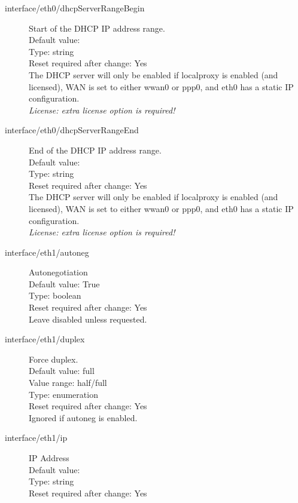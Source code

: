\begin{description}
\item[interface/eth0/dhcpServerRangeBegin] Start of the DHCP IP address range.\\
  Default value: \\
  Type: string\\
  Reset required after change: Yes\\
  The DHCP server will only be enabled if localproxy is enabled (and licensed), WAN is set to either wwan0 or ppp0, and eth0 has a static IP configuration.\\
  \emph{License: extra license option is required!}\\

\item[interface/eth0/dhcpServerRangeEnd] End of the DHCP IP address range.\\
  Default value: \\
  Type: string\\
  Reset required after change: Yes\\
  The DHCP server will only be enabled if localproxy is enabled (and licensed), WAN is set to either wwan0 or ppp0, and eth0 has a static IP configuration.\\
  \emph{License: extra license option is required!}\\

\item[interface/eth1/autoneg] Autonegotiation\\
  Default value: True\\
  Type: boolean\\
  Reset required after change: Yes\\
  Leave disabled unless requested.\\

\item[interface/eth1/duplex] Force duplex.\\
  Default value: full\\
  Value range: half/full\\
  Type: enumeration\\
  Reset required after change: Yes\\
  Ignored if autoneg is enabled.\\

\item[interface/eth1/ip] IP Address\\
  Default value: \\
  Type: string\\
  Reset required after change: Yes\\


\end{description}
